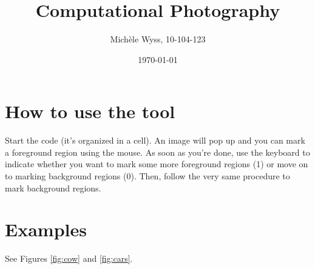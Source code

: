 \documentclass[a4paper]{article}
\title{Computational Photography}
\author{Mich\`ele Wyss, 10-104-123}
\date{\today}
\begin{document}
\maketitle

\section*{How to use the tool}
Start the code (it's organized in a cell). An image will pop up and you can mark a foreground region using the mouse. As soon as you're done, use the keyboard to indicate whether you want to mark some more foreground regions (1) or move on to marking background regions (0). Then, follow the very same procedure to mark background regions.
\section*{Examples}
See Figures \ref{fig:cow} and \ref{fig:cars}.
\end{document}
